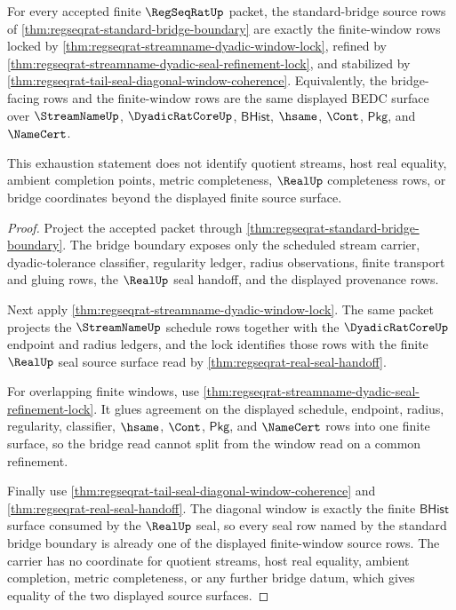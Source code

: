 \begin{theorem}
\label{thm:regseqrat-window-bridge-source-exhaustion}
For every accepted finite $\RegSeqRatUp$ packet, the standard-bridge source
rows of \autoref{thm:regseqrat-standard-bridge-boundary} are exactly the
finite-window rows locked by
\autoref{thm:regseqrat-streamname-dyadic-window-lock}, refined by
\autoref{thm:regseqrat-streamname-dyadic-seal-refinement-lock}, and stabilized
by \autoref{thm:regseqrat-tail-seal-diagonal-window-coherence}. Equivalently,
the bridge-facing rows and the finite-window rows are the same displayed BEDC
surface over $\StreamNameUp$, $\DyadicRatCoreUp$, $\mathsf{BHist}$, $\hsame$,
$\Cont$, $\mathsf{Pkg}$, and $\NameCert$.

This exhaustion statement does not identify quotient streams, host real
equality, ambient completion points, metric completeness, $\RealUp$
completeness rows, or bridge coordinates beyond the displayed finite source
surface.
\end{theorem}
\begin{proof}
Project the accepted packet through
\autoref{thm:regseqrat-standard-bridge-boundary}. The bridge boundary exposes
only the scheduled stream carrier, dyadic-tolerance classifier, regularity
ledger, radius observations, finite transport and gluing rows, the $\RealUp$
seal handoff, and the displayed provenance rows.

Next apply \autoref{thm:regseqrat-streamname-dyadic-window-lock}. The same
packet projects the $\StreamNameUp$ schedule rows together with the
$\DyadicRatCoreUp$ endpoint and radius ledgers, and the lock identifies those
rows with the finite $\RealUp$ seal source surface read by
\autoref{thm:regseqrat-real-seal-handoff}.

For overlapping finite windows, use
\autoref{thm:regseqrat-streamname-dyadic-seal-refinement-lock}. It glues
agreement on the displayed schedule, endpoint, radius, regularity, classifier,
$\hsame$, $\Cont$, $\mathsf{Pkg}$, and $\NameCert$ rows into one finite
surface, so the bridge read cannot split from the window read on a common
refinement.

Finally use \autoref{thm:regseqrat-tail-seal-diagonal-window-coherence} and
\autoref{thm:regseqrat-real-seal-handoff}. The diagonal window is exactly the
finite $\mathsf{BHist}$ surface consumed by the $\RealUp$ seal, so every seal
row named by the standard bridge boundary is already one of the displayed
finite-window source rows. The carrier has no coordinate for quotient streams,
host real equality, ambient completion, metric completeness, or any further
bridge datum, which gives equality of the two displayed source surfaces.
\end{proof}

